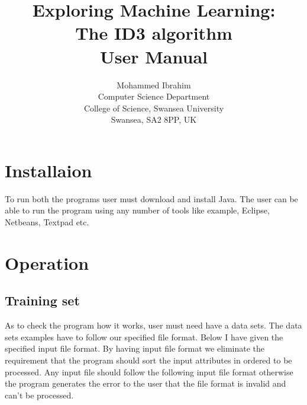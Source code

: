 \documentclass{article}
\begin{document}
\title{Exploring Machine Learning:\\
  The ID3 algorithm\\
  		User Manual}


\author{Mohammed Ibrahim\\
 Computer Science Department\\
  College of Science, Swansea University\\
  Swansea, SA2 8PP, UK
}

\pagebreak

\maketitle
\pagebreak

\tableofcontents


\pagebreak


\section{Installaion}
\label{sec:inst}

To run both the programs user must download and install Java. The user can be able to run the program using any number of tools like example, Eclipse, Netbeans, Textpad etc.

\section{Operation}
\label{sec:op}

\subsection{Training set}
\label{sec:tr}

As to check the program how it works, user must need have a data sets. The data sets examples have to follow our specified file format. Below I have given the specified input file format. By having input file format we eliminate the requirement that the program should sort the input attributes in ordered to be processed.
Any input file should follow the following input file format otherwise the program generates the error to the user that the file format is invalid and can't be processed.
\end{document}
